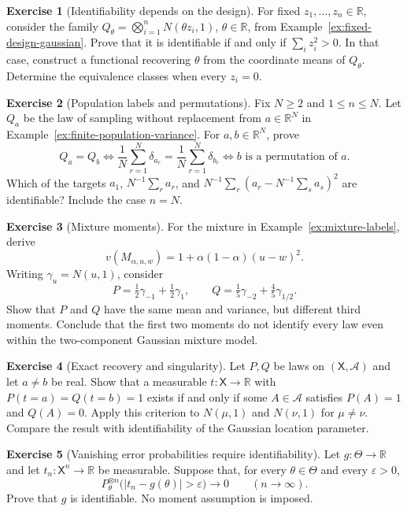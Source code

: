 \documentclass[11pt,oneside]{book}
\theoremstyle{definition}
\newtheorem{exercise}{Exercise}[section]
\theoremstyle{remark}
\newcommand{\R}{\mathbb R}
\begin{document}
\begin{exercise}[Identifiability depends on the design]
\label{exer:fixed-design-identification}
For fixed $z_1,\ldots,z_n\in\R$, consider the family
$Q_\theta=\bigotimes_{i=1}^nN(\theta z_i,1)$, $\theta\in\R$, from
Example~\ref{ex:fixed-design-gaussian}.
Prove that it is identifiable if and only if $\sum_i z_i^2>0$.
In that case, construct a functional recovering $\theta$ from the coordinate
means of $Q_\theta$. Determine the equivalence classes when every $z_i=0$.
\end{exercise}

\begin{exercise}[Population labels and permutations]
\label{exer:population-identification}
Fix $N\geq2$ and $1\leq n\leq N$. Let $Q_a$ be the law of sampling without
replacement from $a\in\R^N$ in
Example~\ref{ex:finite-population-variance}.
For $a,b\in\R^N$, prove
\[
Q_a=Q_b
\iff \frac1N\sum_{r=1}^N\delta_{a_r}
     =\frac1N\sum_{r=1}^N\delta_{b_r}
\iff b\text{ is a permutation of }a.
\]
Which of the targets $a_1$, $N^{-1}\sum_r a_r$, and
$N^{-1}\sum_r(a_r-N^{-1}\sum_s a_s)^2$ are identifiable?
Include the case $n=N$.
\end{exercise}

\begin{exercise}[Mixture moments]
\label{exer:mixture-moments}
For the mixture in Example~\ref{ex:mixture-labels}, derive
\[
v(M_{\alpha,u,w})=1+\alpha(1-\alpha)(u-w)^2.
\]
Writing $\gamma_u=N(u,1)$, consider
\[
P=\tfrac12\gamma_{-1}+\tfrac12\gamma_1,\qquad
Q=\tfrac15\gamma_{-2}+\tfrac45\gamma_{1/2}.
\]
Show that $P$ and $Q$ have the same mean and variance, but different third
moments. Conclude that the first two moments do not identify every law
even within the two-component Gaussian mixture model.
\end{exercise}

\begin{exercise}[Exact recovery and singularity]
\label{exer:exact-recovery-singularity}
Let $P,Q$ be laws on $(\mathsf X,\mathcal A)$ and let $a\ne b$ be real.
Show that a measurable $t:\mathsf X\to\R$ with
$P(t=a)=Q(t=b)=1$ exists if and only if some $A\in\mathcal A$ satisfies
$P(A)=1$ and $Q(A)=0$.
Apply this criterion to $N(\mu,1)$ and $N(\nu,1)$ for $\mu\ne\nu$.
Compare the result with identifiability of the Gaussian location parameter.
\end{exercise}

\begin{exercise}[Vanishing error probabilities require identifiability]
\label{exer:consistency-requires-identifiability}
Let $g:\Theta\to\R$ and let $t_n:\mathsf X^n\to\R$ be measurable.
Suppose that, for every $\theta\in\Theta$ and every $\varepsilon>0$,
\[
P_\theta^{\otimes n}\bigl(|t_n-g(\theta)|>\varepsilon\bigr)
\longrightarrow0\qquad(n\to\infty).
\]
Prove that $g$ is identifiable. No moment assumption is imposed.
\end{exercise}
\end{document}
